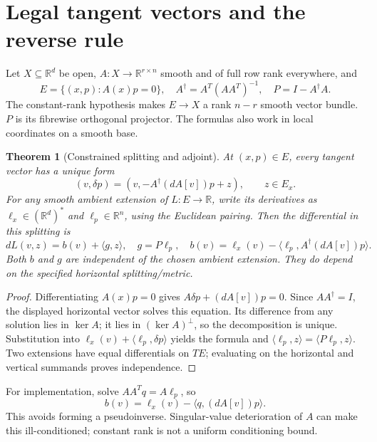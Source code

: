 \documentclass[11pt]{article}
\newtheorem{theorem}{Theorem}\newtheorem{proposition}{Proposition}
\newcommand{\R}{\mathbb R}
\begin{document}
\section{Legal tangent vectors and the reverse rule}
Let $X\subseteq\R^d$ be open, $A:X\to\R^{r\times n}$ smooth and of full row rank everywhere, and
\[
 E=\{(x,p):A(x)p=0\},\quad A^\dagger=A^T(AA^T)^{-1},\quad P=I-A^\dagger A.
\]
The constant-rank hypothesis makes $E\to X$ a rank $n-r$ smooth vector bundle. $P$ is its fibrewise orthogonal projector. The formulas also work in local coordinates on a smooth base.
\begin{theorem}[Constrained splitting and adjoint]
At $(x,p)\in E$, every tangent vector has a unique form
\[
 (v,\delta p)=(v,-A^\dagger(dA[v])p+z),\qquad z\in E_x.
\]
For any smooth ambient extension of $L:E\to\R$, write its derivatives as $\ell_x\in(\R^d)^*$ and $\ell_p\in\R^n$, using the Euclidean pairing. Then the differential in this splitting is
\[
 dL(v,z)=b(v)+\langle g,z\rangle,
\quad g=P\ell_p,
\quad b(v)=\ell_x(v)-\langle\ell_p,A^\dagger(dA[v])p\rangle.
\]
Both $b$ and $g$ are independent of the chosen ambient extension. They do depend on the specified horizontal splitting/metric.
\end{theorem}
\begin{proof}
Differentiating $A(x)p=0$ gives $A\delta p+(dA[v])p=0$. Since $AA^\dagger=I$, the displayed horizontal vector solves this equation. Its difference from any solution lies in $\ker A$; it lies in $(\ker A)^\perp$, so the decomposition is unique. Substitution into $\ell_x(v)+\langle\ell_p,\delta p\rangle$ yields the formula and $\langle\ell_p,z\rangle=\langle P\ell_p,z\rangle$. Two extensions have equal differentials on $TE$; evaluating on the horizontal and vertical summands proves independence.
\end{proof}
For implementation, solve $AA^Tq=A\ell_p$, so
\[
 b(v)=\ell_x(v)-\langle q,(dA[v])p\rangle.
\]
This avoids forming a pseudoinverse. Singular-value deterioration of $A$ can make this ill-conditioned; constant rank is not a uniform conditioning bound.
\end{document}
